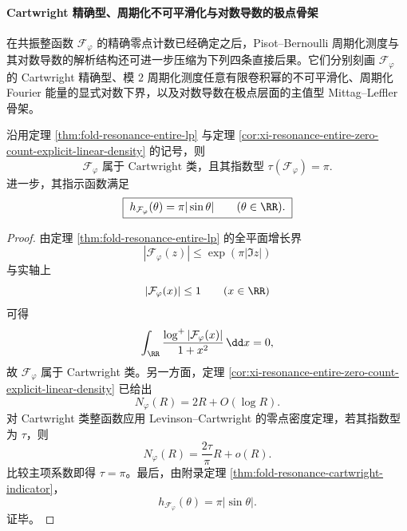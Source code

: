 \paragraph{Cartwright 精确型、周期化不可平滑化与对数导数的极点骨架}
在共振整函数 \(\mathcal F_\varphi\) 的精确零点计数已经确定之后，Pisot--Bernoulli 周期化测度与其对数导数的解析结构还可进一步压缩为下列四条直接后果。它们分别刻画 \(\mathcal F_\varphi\) 的 Cartwright 精确型、模 \(2\) 周期化测度任意有限卷积幂的不可平滑化、周期化 Fourier 能量的显式对数下界，以及对数导数在极点层面的主值型 Mittag--Leffler 骨架。

\begin{corollary}\label{cor:xi-time-part59ab-resonance-cartwright-exact-type}
沿用定理 \ref{thm:fold-resonance-entire-lp} 与定理 \ref{cor:xi-resonance-entire-zero-count-explicit-linear-density} 的记号，则
\[
\boxed{\;
\mathcal F_\varphi \text{ 属于 Cartwright 类，且其指数型 }
\tau(\mathcal F_\varphi)=\pi.\;}
\]
进一步，其指示函数满足
\[
\boxed{\;
h_{\mathcal F_\varphi}(\theta)=\pi|\sin\theta|
\qquad (\theta\in\RR).\;}
\]
\end{corollary}
\begin{proof}
由定理 \ref{thm:fold-resonance-entire-lp} 的全平面增长界
\[
|\mathcal F_\varphi(z)|\le \exp(\pi|\Im z|)
\]
与实轴上
\[
|\mathcal F_\varphi(x)|\le 1
\qquad (x\in\RR)
\]
可得
\[
\int_{\RR}\frac{\log^+|\mathcal F_\varphi(x)|}{1+x^2}\,\dd x=0,
\]
故 \(\mathcal F_\varphi\) 属于 Cartwright 类。另一方面，定理
\ref{cor:xi-resonance-entire-zero-count-explicit-linear-density} 已给出
\[
N_\varphi(R)=2R+O(\log R).
\]
对 Cartwright 类整函数应用 Levinson--Cartwright 的零点密度定理，若其指数型为 \(\tau\)，则
\[
N_\varphi(R)=\frac{2\tau}{\pi}R+o(R).
\]
比较主项系数即得 \(\tau=\pi\)。最后，由附录定理
\ref{thm:fold-resonance-cartwright-indicator}，
\[
h_{\mathcal F_\varphi}(\theta)=\pi|\sin\theta|.
\]
证毕。
\end{proof}

